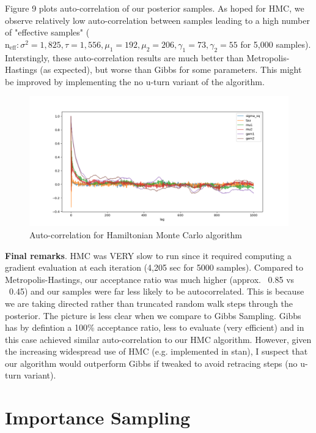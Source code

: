 \documentclass[12pt,letterpaper,twoside]{article}
\begin{document}
Figure 9 plots auto-correlation of our posterior samples. As hoped
for HMC, we observe relatively low auto-correlation between 
samples leading to a high number of "effective samples" ($\text{n}_{\text{eff}}: \sigma^2=1,825, \tau=1,556, \mu_1=192, \mu_2=206, \gamma_1=73, \gamma_2=55$ 
for 5,000 samples). Interstingly, these auto-correlation results are 
much better than Metropolis-Hastings (as expected), but worse than 
Gibbs for some parameters. This might be improved by implementing the 
no u-turn variant of the algorithm. 
\begin{figure}[H]
    \centering
    \includegraphics[scale=0.6]{hmc_autocorr_plot.png}
    \vspace*{-10mm}
    \caption{Auto-correlation for Hamiltonian Monte Carlo algorithm}
\end{figure}

\textbf{Final remarks}. HMC was VERY slow to run since it required 
computing a gradient evaluation at each iteration (4,205 sec 
for 5000 samples). Compared to Metropolis-Hastings, our acceptance ratio 
was much higher (approx. ~0.85 vs ~0.45) and our samples were far less likely 
to be autocorrelated. This is because we are taking directed rather than 
truncated random walk steps through the posterior. The picture is 
less clear when we compare to Gibbs Sampling. Gibbs has by defintion 
a 100\% acceptance ratio, less to evaluate (very efficient) and in this 
case achieved similar auto-correlation to our HMC algorithm. However, given 
the increasing widespread use of HMC (e.g. implemented in stan), 
I suspect that our algorithm would outperform Gibbs if tweaked to 
avoid retracing steps (no u-turn variant).



\newpage
\section{Importance Sampling}
\end{document}
